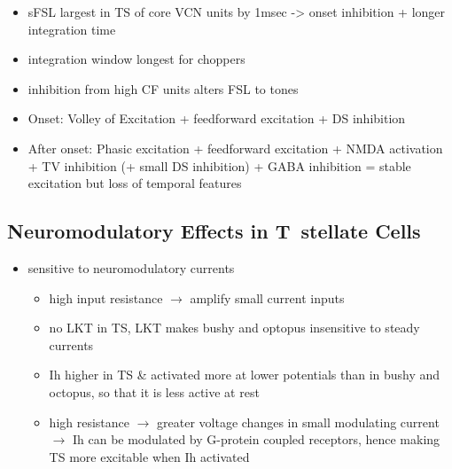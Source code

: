 \begin{itemize}
\item sFSL largest in TS of core VCN units by 1msec -> onset inhibition + longer integration time \citep{GisbergenGrashuisEtAl:1975,GisbergenGrashuisEtAl:1975a,GisbergenGrashuisEtAl:1975b,YoungRobertEtAl:1988,PaoliniClareyEtAl:2004}
\item integration window longest for choppers \citep{McGinleyOertel:2006}
\item inhibition from high CF units alters FSL to tones \citep{Wickesberg:1996}
\item Onset: Volley of Excitation + feedforward excitation + DS inhibition
\item After onset: Phasic excitation + feedforward excitation + NMDA activation + TV inhibition (+ small DS inhibition) + GABA inhibition = stable excitation but loss of temporal features
\end{itemize}

\citep{JorisSmithEtAl:1994}


\subsection{Neuromodulatory Effects in T~stellate Cells}




\begin{itemize}
\item sensitive to neuromodulatory currents \citep{FujinoOertel:2001}
\begin{itemize}
\item high input resistance $\rightarrow$ amplify small current inputs \citep{FujinoOertel:2001}
\item no LKT in TS,  LKT makes bushy and optopus insensitive to steady currents \citep{OertelFujino:2001,McGinleyOertel:2006}
\item Ih higher in TS \& activated more at lower potentials than in bushy and octopus, so that it is less active at rest
\item high resistance $\rightarrow$ greater voltage changes in small modulating current $\rightarrow$ Ih can be modulated by G-protein coupled receptors, hence making TS more excitable when Ih activated \citep{RodriguesOertel:2006}
\end{itemize}
\end{itemize}

